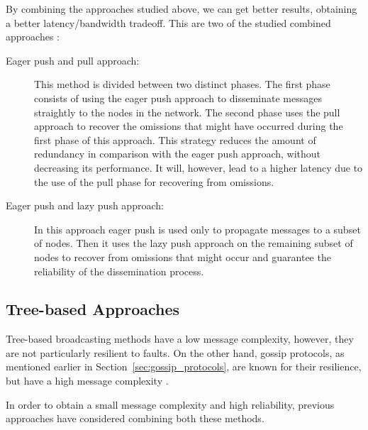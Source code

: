 By combining the approaches studied above, we can get better results, obtaining a better
latency/bandwidth tradeoff. This are two of the studied combined approaches \cite{Carvalho2007}:
\begin{description}
      \item[Eager push and pull approach:] This method is divided between two distinct phases.
            The first phase consists of using the eager push approach to disseminate messages
            straightly to the nodes in the network. The second phase uses the pull approach to
            recover the omissions that might have occurred during the first phase of this
            approach. This strategy reduces the amount of redundancy in comparison with the
            eager push approach, without decreasing its performance. It will, however, lead to
            a higher latency due to the use of the pull phase for recovering from omissions.
      \item[Eager push and lazy push approach:] In this approach eager push is used only to
            propagate messages to a subset of nodes. Then it uses the lazy push approach on
            the remaining subset of nodes to recover from omissions that might occur and
            guarantee the reliability of the dissemination process.
\end{description}


\subsection{Tree-based Approaches}
\label{subsec:gossip_tree_based_approaches}
Tree-based broadcasting methods have a low message complexity, however, they are not
particularly resilient to faults. On the other hand, gossip protocols, as mentioned earlier
in Section~\ref{sec:gossip_protocols}, are known for their resilience, but have a
high message complexity \cite{Leitao2007Tree}.

In order to obtain a small message complexity and high reliability, previous approaches have
considered combining both these methods.

